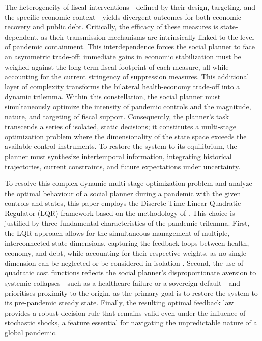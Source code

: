 \documentclass[12pt, a4paper]{article}
\begin{document}
The heterogeneity of fiscal interventions—defined by their design, targeting, and the specific economic context—yields divergent outcomes for both economic recovery and public debt. Critically, the efficacy of these measures is state-dependent, as their transmission mechanisms are intrinsically linked to the level of pandemic containment. This interdependence forces the social planner to face an asymmetric trade-off: immediate gains in economic stabilization must be weighed against the long-term fiscal footprint of each measure, all while accounting for the current stringency of suppression measures. This additional layer of complexity transforms the bilateral health-economy trade-off into a dynamic trilemma. Within this constellation, the social planner must simultaneously optimize the intensity of pandemic controls and the magnitude, nature, and targeting of fiscal support. Consequently, the planner's task transcends a series of isolated, static decisions; it constitutes a multi-stage optimization problem where the dimensionality of the state space exceeds the available control instruments. To restore the system to its equilibrium, the planner must synthesize intertemporal information, integrating historical trajectories, current constraints, and future expectations under uncertainty.


To resolve this complex dynamic multi-stage optimization problem and analyze the optimal behaviour of a social planner during a pandemic with the given controls and states, this paper employs the Discrete-Time Linear-Quadratic Regulator (LQR) framework based on the methodology of \citep{bertsekas2017dynamic}. This choice is justified by three fundamental characteristics of the pandemic trilemma. First, the LQR approach allows for the simultaneous management of multiple, interconnected state dimensions, capturing the feedback loops between health, economy, and debt, while accounting for their respective weights, as no single dimension can be neglected or be considered in isolation . Second, the use of quadratic cost functions reflects the social planner's disproportionate aversion to systemic collapses—such as a healthcare failure or a sovereign default—and prioritises proximity to the origin, as the primary goal is to restore the system to its pre-pandemic steady state. Finally, the resulting optimal feedback law provides a robust decision rule that remains valid even under the influence of stochastic shocks, a feature essential for navigating the unpredictable nature of a global pandemic.
\end{document}
